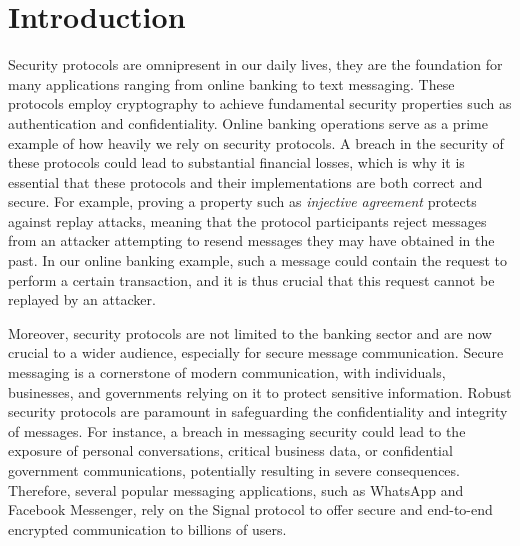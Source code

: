 \chapter{Introduction}
\label{chap:introduction}


Security protocols are omnipresent in our daily lives, they are the foundation for many applications ranging from online banking to text messaging. These protocols employ cryptography to achieve fundamental security properties such as authentication and confidentiality.
Online banking operations serve as a prime example of how heavily we rely on security protocols. A breach in the security of these protocols could lead to substantial financial losses, which is why it is essential that these protocols and their implementations are both correct and secure.
For example, proving a property such as \emph{injective agreement} protects against replay attacks, meaning that the protocol participants reject messages from an attacker attempting to resend messages they may have obtained in the past. In our online banking example, such a message could contain the request to perform a certain transaction, and it is thus crucial that this request cannot be replayed by an attacker.

Moreover, security protocols are not limited to the banking sector and are now crucial to a wider audience, especially for secure message communication. 
Secure messaging is a cornerstone of modern communication, with individuals, businesses, and governments relying on it to protect sensitive information.
Robust security protocols are paramount in safeguarding the confidentiality and integrity of messages.
For instance, a breach in messaging security could lead to the exposure of personal conversations, critical business data, or confidential government communications, potentially resulting in severe consequences.
Therefore, several popular messaging applications, such as WhatsApp and Facebook Messenger, rely on the Signal protocol \cite{} to offer secure and end-to-end encrypted communication to billions of users.

